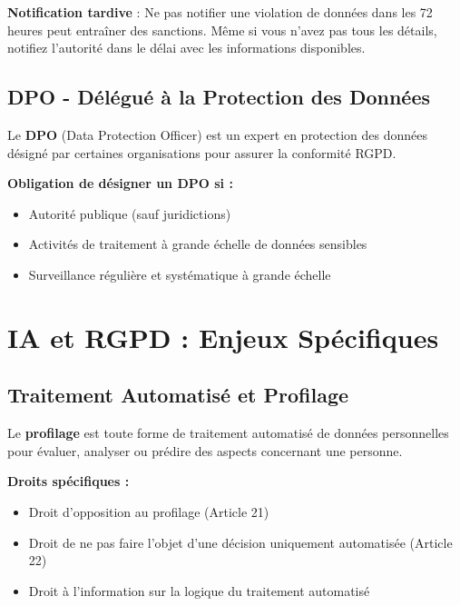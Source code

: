 \documentclass[11pt,a4paper]{article}
\begin{document}
\begin{dangerbox}
\textbf{Notification tardive} : Ne pas notifier une violation de données dans les 72 heures peut entraîner des sanctions. Même si vous n'avez pas tous les détails, notifiez l'autorité dans le délai avec les informations disponibles.
\end{dangerbox}

\subsection{DPO - Délégué à la Protection des Données}

\begin{definitionbox}
Le \textbf{DPO} (Data Protection Officer) est un expert en protection des données désigné par certaines organisations pour assurer la conformité RGPD.
\end{definitionbox}

\textbf{Obligation de désigner un DPO si :}
\begin{itemize}
    \item Autorité publique (sauf juridictions)
    \item Activités de traitement à grande échelle de données sensibles
    \item Surveillance régulière et systématique à grande échelle
\end{itemize}

\section{IA et RGPD : Enjeux Spécifiques}

\subsection{Traitement Automatisé et Profilage}

\begin{definitionbox}
Le \textbf{profilage} est toute forme de traitement automatisé de données personnelles pour évaluer, analyser ou prédire des aspects concernant une personne.
\end{definitionbox}

\textbf{Droits spécifiques :}
\begin{itemize}
    \item Droit d'opposition au profilage (Article 21)
    \item Droit de ne pas faire l'objet d'une décision uniquement automatisée (Article 22)
    \item Droit à l'information sur la logique du traitement automatisé
\end{itemize}
\end{document}
